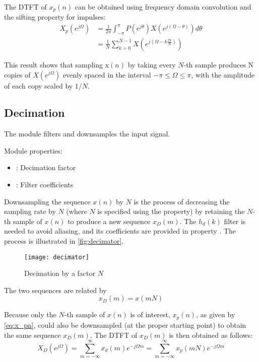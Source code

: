 The DTFT of $x_p(n)$ can be obtained using frequency domain convolution and the sifting property for impulses:
\begin{align}
  X_p\left(e^{j\Omega}\right) &= \frac{1}{2\pi}\int_{-\pi}^{\pi}P\left(e^{j\theta}\right)X\left(e^{j\left(\Omega-\theta\right)}\right)d\theta \nonumber\\
                              &= \frac{1}{N}\sum_{k=0}^{N-1}X\left(e^{j\left(\Omega-k\frac{2\pi}{N}\right)}\right) \label{eq:X_p}
\end{align}

This result shows that sampling x$(n)$ by taking every $N$-th sample produces N copies of $X\left(e^{j\Omega}\right)$ evenly spaced in the interval $-\pi\leq\Omega\leq\pi$, with the amplitude of each copy scaled by $1/N$.

\subsection{Decimation}

The  module filters and downsamples the input signal.

\noindent Module properties:
\begin{itemize}
  \item {}: Decimation factor
  \item {}: Filter coefficients
\end{itemize}

Downsampling the sequence $x(n)$ by $N$ is the process of decreasing the sampling rate by $N$ (where $N$ is specified using the  property) by retaining the $N$-th sample of $x(n)$ to produce a new sequence $x_D(m)$. The $h_d(k)$ filter is needed to avoid aliasing, and its coefficients are provided in property . The process is illustrated in \autoref{fig:decimator}.

\begin{figure}[ht]
  \centering
  \texttt{[image: decimator]}
  \caption{Decimation by a factor $N$}
  \label{fig:decimator}
\end{figure}

The two sequences are related by
\begin{equation}
  x_D(m)=x(mN)
\end{equation}

Because only the $N$-th sample of $x(n)$ is of interest, $x_p(n)$, as given by \eqref{eq:x_pn}, could also be downsampled (at the proper starting point) to obtain the same sequence $x_D(m)$. The DTFT of $x_D(m)$ is then obtained as follows:
\begin{equation}
  X_D(e^{j\Omega}) = \sum_{m=-\infty}^{\infty} x_d(m)e^{-j\Omega m} = \sum_{m=-\infty}^{\infty} x_p(mN)e^{-j\Omega m}
\end{equation}


